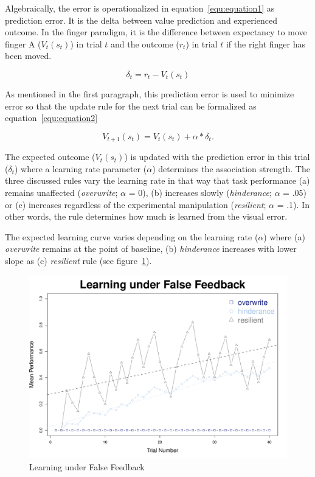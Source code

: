 \documentclass[man]{apa7}
\begin{document}
Algebraically, the error is operationalized in equation~\ref{equ:equation1} as prediction error. It is the delta between value prediction and experienced outcome. In the finger paradigm, it is the difference between expectancy to move finger A ($V_t(s_t)$) in trial $t$ and the outcome ($r_t$) in trial $t$ if the right finger has been moved.

\begin{equation} \label{equation1}
\delta_t = r_t - V_t(s_t)
\label{equ:equation1}
\end{equation}

As mentioned in the first paragraph, this prediction error is used to minimize error so that the update rule for the next trial can be formalized as equation~\ref{equ:equation2}

\begin{equation} \label{equation2}
V_{t+1}(s_t)=V_{t}(s_t) + \alpha * \delta_t.
\label{equ:equation2}
\end{equation}

The expected outcome ($V_{t}(s_t)$) is updated with the prediction error in this trial ($\delta_t$) where a learning rate parameter ($\alpha$) determines the association strength. The three discussed rules vary the learning rate in that way that task performance (a) remains unaffected (\textit{overwrite}; $\alpha$ = 0), (b) increases slowly (\textit{hinderance}; $\alpha$ = .05) or (c) increases regardless of the experimental manipulation (\textit{resilient}; $\alpha$ = .1). In other words, the rule determines how much is learned from the visual error.

The expected learning curve varies depending on the learning rate ($\alpha$) where (a) \textit{overwrite} remains at the point of baseline, (b) \textit{hinderance} increases with lower slope as (c) \textit{resilient} rule (see figure~\ref{fig:Figure1}).

\begin{figure}
    \caption{Learning under False Feedback }
    \includegraphics[scale=.6]{Figures/learning-curve.pdf}
    
    \label{fig:Figure1}
\end{figure}
\end{document}
